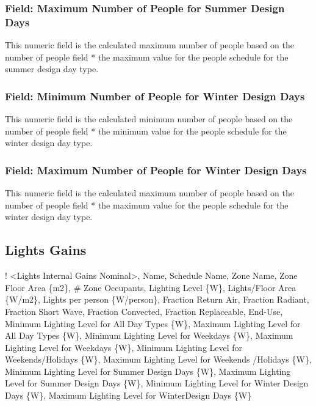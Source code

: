 \subsubsection{Field: Maximum Number of People for Summer Design Days}\label{field-maximum-number-of-people-for-summer-designdays}

This numeric field is the calculated maximum number of people based on the number of people field * the maximum value for the people schedule for the summer design day type.

\subsubsection{Field: Minimum Number of People for Winter Design Days}\label{field-minimum-number-of-people-for-winter-designdays}

This numeric field is the calculated minimum number of people based on the number of people field * the minimum value for the people schedule for the winter design day type.

\subsubsection{Field: Maximum Number of People for Winter Design Days}\label{field-maximum-number-of-people-for-winter-designdays}

This numeric field is the calculated maximum number of people based on the number of people field * the maximum value for the people schedule for the winter design day type.

\subsection{Lights Gains}\label{lights-gains}

! \textless{}Lights Internal Gains Nominal\textgreater{}, Name, Schedule Name, Zone Name, Zone Floor Area \{m2\}, \# Zone Occupants, Lighting Level \{W\}, Lights/Floor Area \{W/m2\}, Lights per person \{W/person\}, Fraction Return Air, Fraction Radiant, Fraction Short Wave, Fraction Convected, Fraction Replaceable, End-Use,  Minimum Lighting Level for All Day Types \{W\}, Maximum Lighting Level for All Day Types \{W\}, Minimum Lighting Level for Weekdays \{W\},  Maximum Lighting Level for Weekdays \{W\}, Minimum Lighting Level for Weekends/Holidays \{W\}, Maximum Lighting Level for Weekends /Holidays \{W\}, Minimum Lighting Level for Summer Design Days \{W\}, Maximum Lighting Level for Summer Design Days \{W\}, Minimum Lighting Level for Winter Design Days \{W\}, Maximum Lighting Level for WinterDesign Days \{W\}

